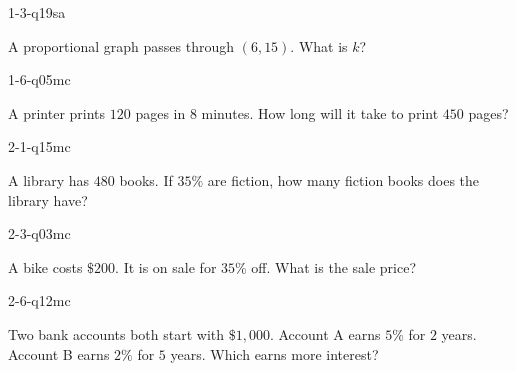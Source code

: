 
\begin{practiceQuestion}{1-3-q19}{sa}
\begin{questionText}
A proportional graph passes through $(6, 15)$. What is $k$?
\end{questionText}
\end{practiceQuestion}

\begin{practiceQuestion}{1-6-q05}{mc}
\begin{questionText}
A printer prints $120$ pages in $8$ minutes. How long will it take to print $450$ pages?
\end{questionText}
\end{practiceQuestion}

\begin{practiceQuestion}{2-1-q15}{mc}
\begin{questionText}
A library has $480$ books. If $35\%$ are fiction, how many fiction books does the library have?
\end{questionText}
\end{practiceQuestion}

\begin{practiceQuestion}{2-3-q03}{mc}
\begin{questionText}
A bike costs $\$200$. It is on sale for $35\%$ off. What is the sale price?
\end{questionText}
\end{practiceQuestion}

\begin{practiceQuestion}{2-6-q12}{mc}
\begin{questionText}
Two bank accounts both start with $\$1{,}000$. Account A earns $5\%$ for $2$ years. Account B earns $2\%$ for $5$ years. Which earns more interest?
\end{questionText}
\end{practiceQuestion}

